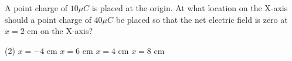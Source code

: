\item A point charge of \(10 \mu C\) is placed at the origin. At what location on the X-axis should a point charge of \(40 \mu C\) be placed so that the net electric field is zero at \(x = 2 \text{ cm}\) on the X-axis?
    \begin{tasks}(2)
        \task \( x = -4 \text{ cm} \)
        \task \( x = 6 \text{ cm} \)
        \task \( x = 4 \text{ cm} \)
        \task \( x = 8 \text{ cm} \)
    \end{tasks}